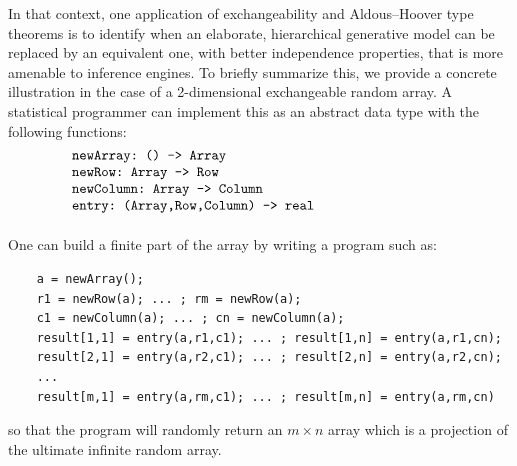 \documentclass[AHL,Unicode,longabstracts,published]{cedram}
\begin{document}
In that context, one application of exchangeability and Aldous--Hoover type theorems is to identify when an elaborate, hierarchical generative model can be replaced by an equivalent one, with better independence properties, that is more amenable to inference engines. To briefly summarize this, we provide a concrete illustration in the case of a 2-dimensional exchangeable random array. A statistical programmer can implement this as an abstract data type with the following functions:
{\small
\begin{equation}\label{eqn:datatype}
\begin{minipage}{0.9\linewidth}
\begin{verbatim}
	newArray: () -> Array
	newRow: Array -> Row
	newColumn: Array -> Column
	entry: (Array,Row,Column) -> real
	\end{verbatim}
\end{minipage}
\end{equation}
}
One can build a finite part of the array by writing a program such as:
{\small
\begin{verbatim}
	a = newArray();
	r1 = newRow(a); ... ; rm = newRow(a);
	c1 = newColumn(a); ... ; cn = newColumn(a);
	result[1,1] = entry(a,r1,c1); ... ; result[1,n] = entry(a,r1,cn);
	result[2,1] = entry(a,r2,c1); ... ; result[2,n] = entry(a,r2,cn);
	... 
	result[m,1] = entry(a,rm,c1); ... ; result[m,n] = entry(a,rm,cn)
\end{verbatim}}
so that the program will randomly return an $m\times n$ array which is a projection of the ultimate infinite random array.
\end{document}
